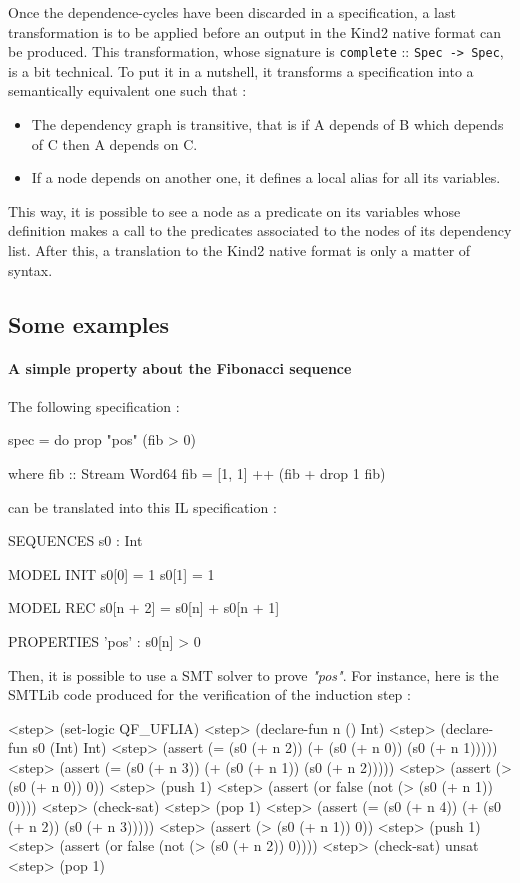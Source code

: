 \bigskip


Once the dependence-cycles have been discarded in a specification, a last transformation is to be applied before an output in the Kind2 native format can be produced. This transformation, whose signature is  \texttt{complete} :: \texttt{Spec -> Spec}, is a bit technical. To put it in a nutshell, it transforms a specification into a semantically equivalent one such that :

\begin{itemize}
\item The dependency graph is transitive, that is if A depends of B which depends of C then A depends on C.
\item If a node depends on another one, it defines a local alias for all its variables.
\end{itemize}
This way, it is possible to see a node as a predicate on its variables whose definition makes a call to the predicates associated to the nodes of its dependency list. After this, a translation to the Kind2 native format is only a matter of syntax.

\subsection{Some examples}

\paragraph{A simple property about the Fibonacci sequence}

The following specification :

\begin{code}
spec = do
  prop "pos" (fib > 0)

  where
    fib :: Stream Word64
    fib = [1, 1] ++ (fib + drop 1 fib)
\end{code}
can be translated into this IL specification :
\begin{code}
SEQUENCES
    s0 : Int

MODEL INIT
    s0[0] = 1
    s0[1] = 1

MODEL REC
    s0[n + 2] = s0[n] + s0[n + 1]

PROPERTIES
    'pos' : s0[n] > 0
\end{code}
Then, it is possible to use a SMT solver to prove \textit{"pos"}. For instance, here is the SMTLib code produced for the verification of the induction step :
\begin{code}
<step>  (set-logic QF_UFLIA)
<step>  (declare-fun n () Int)
<step>  (declare-fun s0 (Int) Int)
<step>  (assert (= (s0 (+ n 2)) (+ (s0 (+ n 0)) (s0 (+ n 1)))))
<step>  (assert (= (s0 (+ n 3)) (+ (s0 (+ n 1)) (s0 (+ n 2)))))
<step>  (assert (> (s0 (+ n 0)) 0))
<step>  (push 1)
<step>  (assert (or false (not (> (s0 (+ n 1)) 0))))
<step>  (check-sat)
<step>  (pop 1)
<step>  (assert (= (s0 (+ n 4)) (+ (s0 (+ n 2)) (s0 (+ n 3)))))
<step>  (assert (> (s0 (+ n 1)) 0))
<step>  (push 1)
<step>  (assert (or false (not (> (s0 (+ n 2)) 0))))
<step>  (check-sat)
unsat
<step>  (pop 1)
\end{code}

